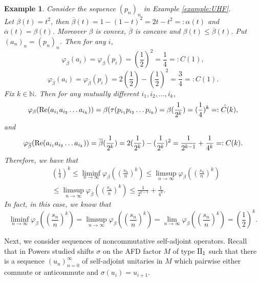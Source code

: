 \documentclass[a4paper,12pt]{amsart}
\newtheorem{example}[definition]{Example}
\newcommand{\N}{\mathbb{N}}
\begin{document}
\begin{example} \rm
Consider the sequence $(p_n)_n$ in Example \ref{example:UHF}.  \\
Let $\beta (t) =t^2$, then  $\overline{\beta}(t) = 1 - (1-t)^2 = 2t -t^2 =:\alpha(t)$ and $\overline{\alpha}(t) = \beta (t)$. 
Moreover $\beta$ is convex, $\overline{\beta}$ is concave and $\beta (t) \leq \overline{\beta}(t)$.  
Put $(a_n)_n = (p_n)_n$.  Then for any $i$, 
$$
\varphi_{\beta}(a_i) = \varphi_{\beta}(p_i) = (\frac{1}{2})^2 = \frac{1}{4} =: \hat{C}(1), 
$$
$$
\varphi_{\overline{\beta}}(a_i) = \varphi_{\overline{\beta}}(p_i) 
= 2(\frac{1}{2}) - (\frac{1}{2})^2 = \frac{3}{4} =:C(1).
$$
Fix $k \in  \N$. Then for any mutually different $i_1, i_2, \dots, i_k$, 
$$
\varphi_{\beta}({\rm Re} (a_{i_1}a_{i_2} \dots a_{i_k}) ) = \beta(\tau(p_{i_1}p_{i_2} \dots p_{i_k}) = 
\beta(\frac{1}{2^k}) = (\frac{1}{4})^k =: \hat{C(}k), 
$$
and  
$$
\varphi_{\overline{\beta}}({\rm Re} (a_{i_1}a_{i_2} \dots a_{i_k}) ) =  
\overline{\beta}(\frac{1}{2^k}) =2(\frac{1}{2^k}) - (\frac{1}{2^k})^2=\frac{1}{2^{k-1}} +  \frac{1}{4^k}=:C(k). 
$$  
Therefore,  we have that
\begin{align*}
 &(\frac{1}{4})^k \leq \liminf _{n \to \infty}  \varphi_{\beta}((\frac{s_n}{n})^k) 
\leq \limsup _{n \to \infty}  \varphi_{\beta}((\frac{s_n}{n})^k)\\ 
& \leq  \limsup _{n \to \infty}  \varphi_{\overline{\beta}}((\frac{s_n}{n})^k) \leq \frac{1}{2^{k-1}} +  \frac{1}{4^k}. 
\end{align*}
In fact, in this case, we know that 
\[
\liminf _{n \to \infty}  \varphi_{\beta}((\frac{s_n}{n})^k) =  \limsup _{n \to \infty}  \varphi_{\beta}((\frac{s_n}{n})^k)
= \lim  _{n \to \infty}  \varphi_{\beta}((\frac{s_n}{n})^k) = (\frac{1}{2})^k. 
\]
\end{example}

Next, we consider sequences of noncommutative self-adjoint operators.  Recall that  in \cite{powers} Powers studied shifts $\sigma$  
on the AFD factor $M$ of type ${\rm II}_1$ such that there is a sequence $(u_n)_{n=0}^\infty$ of self-adjoint unitaries
in $M$ which pairwise either commute or anticommute and $\sigma(u_i) = u_{i+1}$. 
\end{document}
